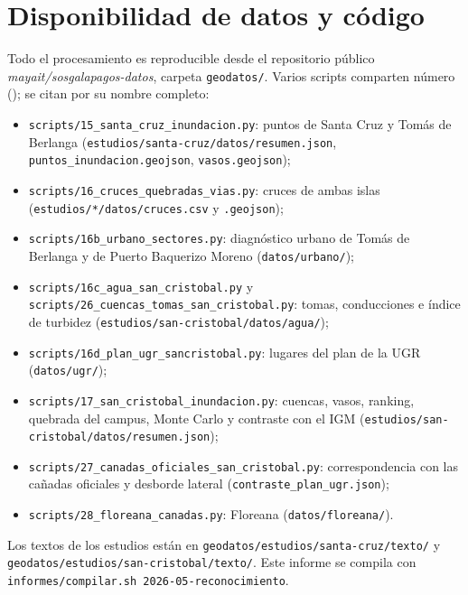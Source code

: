 \documentclass{sosg-informe}
\begin{document}
\section*{Disponibilidad de datos y código}
{\small Todo el procesamiento es reproducible desde el repositorio público \emph{mayait/sosgalapagos-datos}, carpeta \texttt{geodatos/}. Varios scripts comparten número (); se citan por su nombre completo:
\begin{itemize}
  \item \texttt{scripts/15\_santa\_cruz\_inundacion.py}: puntos de Santa Cruz y Tomás de Berlanga (\texttt{estudios/santa-cruz/datos/resumen.json}, \texttt{puntos\_inundacion.geojson}, \texttt{vasos.geojson});
  \item \texttt{scripts/16\_cruces\_quebradas\_vias.py}: cruces de ambas islas (\texttt{estudios/*/datos/cruces.csv} y \texttt{.geojson});
  \item \texttt{scripts/16b\_urbano\_sectores.py}: diagnóstico urbano de Tomás de Berlanga y de Puerto Baquerizo Moreno (\texttt{datos/urbano/});
  \item \texttt{scripts/16c\_agua\_san\_cristobal.py} y \texttt{scripts/26\_cuencas\_tomas\_san\_cristobal.py}: tomas, conducciones e índice de turbidez (\texttt{estudios/san-cristobal/datos/agua/});
  \item \texttt{scripts/16d\_plan\_ugr\_sancristobal.py}: lugares del plan de la UGR (\texttt{datos/ugr/});
  \item \texttt{scripts/17\_san\_cristobal\_inundacion.py}: cuencas, vasos, ranking, quebrada del campus, Monte Carlo y contraste con el IGM (\texttt{estudios/san-cristobal/datos/resumen.json});
  \item \texttt{scripts/27\_canadas\_oficiales\_san\_cristobal.py}: correspondencia con las cañadas oficiales y desborde lateral (\texttt{contraste\_plan\_ugr.json});
  \item \texttt{scripts/28\_floreana\_canadas.py}: Floreana (\texttt{datos/floreana/}).
\end{itemize}
Los textos de los estudios están en \texttt{geodatos/estudios/santa-cruz/texto/} y \texttt{geodatos/estudios/san-cristobal/texto/}. Este informe se compila con \texttt{informes/compilar.sh 2026-05-reconocimiento}.\par}



\end{document}
